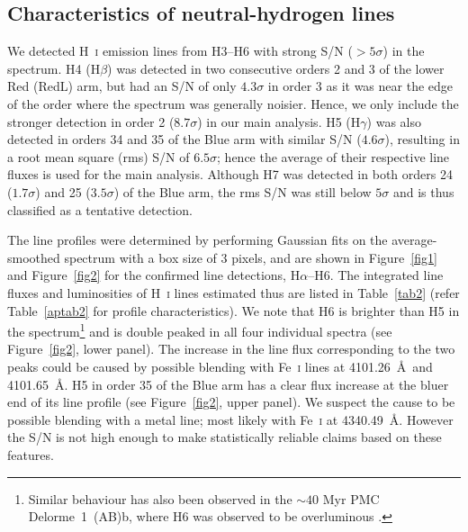 \documentclass{aa}
\newcommand{\Hb}{\ensuremath{\mathrm{H}\beta}\xspace}
\newcommand{\Hi}{H~\textsc{i}\xspace}
\newcommand{\Hei}{He~\textsc{i}\xspace}
\begin{document}
\subsection{Characteristics of neutral-hydrogen lines} \label{profilechar}
We detected \Hi emission lines from H3--H6 with strong S/N ($>5\sigma$) in the spectrum. H4 (\Hb) was detected in two consecutive orders 2 and 3 of the lower Red (RedL) arm, but had an S/N of only $4.3\sigma$ in order 3 as it was near the edge of the order where the spectrum was generally noisier. Hence, we only include the stronger detection in order 2 ($8.7\sigma$) in our main analysis. H5 (H$\gamma$) was also detected in orders 34 and 35 of the Blue arm with similar S/N ($4.6\sigma$), resulting in a root mean square (rms) S/N of $6.5\sigma$; hence the average of their respective line fluxes is used for the main analysis. Although H7 was detected in both orders 24 ($1.7\sigma$) and 25 ($3.5\sigma$) of the Blue arm, the rms S/N was still below $5\sigma$ and is thus classified as a tentative detection. 

The line profiles were determined by performing Gaussian fits on the average-smoothed spectrum with a box size of 3 pixels, and are shown in Figure~\ref{fig1} and Figure~\ref{fig2} for the confirmed line detections, H$\alpha$--H6. The integrated line fluxes and luminosities of H~\textsc{i} lines estimated thus are listed in Table~\ref{tab2} (refer Table~\ref{aptab2} for profile characteristics). We note that H6 is brighter than H5 in the spectrum\footnote{Similar behaviour has also been observed in the $\sim40$ Myr PMC Delorme~1~(AB)b, where H6 was observed to be overluminous \citep[see ][]{ringqvist2023}.} and is double peaked in all four individual spectra (see Figure~\ref{fig2}, lower panel). The increase in the line flux corresponding to the two peaks could be caused by possible blending with Fe~\textsc{i} lines at 4101.26~\AA\ and 4101.65~\AA. H5 in order 35 of the Blue arm has a clear flux increase at the bluer end of its line profile (see Figure~\ref{fig2}, upper panel). We suspect the cause to be possible blending with a metal line; most likely with Fe~\textsc{i} at 4340.49~\AA. However the S/N is not high enough to make statistically reliable claims based on these features.
\end{document}
